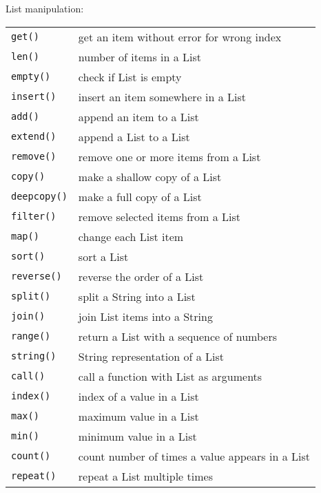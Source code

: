 List manipulation:
\label{list-functions}
\begin{center} \begin{tabular}{l l}
				\verb!get()! & get an item without error for wrong index \\
				\verb!len()! & number of items in a List \\
				\verb!empty()! & check if List is empty \\
				\verb!insert()! & insert an item somewhere in a List \\
				\verb!add()! & append an item to a List \\
				\verb!extend()! & append a List to a List \\
				\verb!remove()! & remove one or more items from a List \\
				\verb!copy()! & make a shallow copy of a List \\
				\verb!deepcopy()! & make a full copy of a List \\
				\verb!filter()! & remove selected items from a List \\
				\verb!map()! & change each List item \\
				\verb!sort()! & sort a List \\
				\verb!reverse()! & reverse the order of a List \\
				\verb!split()! & split a String into a List \\
				\verb!join()! & join List items into a String \\
				\verb!range()! & return a List with a sequence of numbers \\
				\verb!string()! & String representation of a List \\
				\verb!call()! & call a function with List as arguments \\
				\verb!index()! & index of a value in a List \\
				\verb!max()! & maximum value in a List \\
				\verb!min()! & minimum value in a List \\
				\verb!count()! & count number of times a value appears in a List \\
				\verb!repeat()! & repeat a List multiple times \\
\end{tabular} \end{center}


